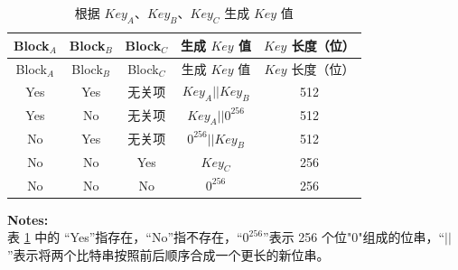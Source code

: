 \begin{longtable}[c]{ |c|c|c|c|c| }
\caption{ 根据 \begin{math}Key_{A}\end{math}、\begin{math}Key_{B}\end{math}、\begin{math}Key_{C}\end{math} 生成 \begin{math}Key\end{math} 值 }
\label{tab:extmemencr-key-possibility}
\\\hline 
\rowcolor{lightgray}
Block$_A$ & Block$_B$ & Block$_C$ & 生成 \begin{math}Key\end{math} 值  & \begin{math}Key\end{math} 长度（位）\\\hline
\endfirsthead
\hline
\rowcolor{lightgray}
Block$_A$ & Block$_B$ & Block$_C$ & 生成 \begin{math}Key\end{math} 值  & \begin{math}Key\end{math} 长度（位）\\\hline
\endhead
\endfoot
Yes &   Yes   &  无关项    &   \begin{math}Key_{A} || Key_{B}\end{math}    &   512   \\\hline
Yes &   No    &  无关项    &   \begin{math}Key_{A} || 0^{256}\end{math}    &   512   \\\hline
No  &   Yes   &  无关项    &   \begin{math}0^{256} || Key_{B}\end{math}    &   512   \\\hline
No  &   No    &  Yes       &   \begin{math}           Key_{C}\end{math}    &   256   \\\hline
No  &   No    &  No        &   \begin{math}           0^{256}\end{math}    &   256   \\\hline
\end{longtable}
\vspace{-1.5em}
{\bfseries Notes: }\\
表 \ref{tab:extmemencr-key-possibility} 中的 “Yes”指存在，“No”指不存在，“\begin{math}0^{256}\end{math}”表示 256 个位"0"组成的位串，“\begin{math}||\end{math}”表示将两个比特串按照前后顺序合成一个更长的新位串。